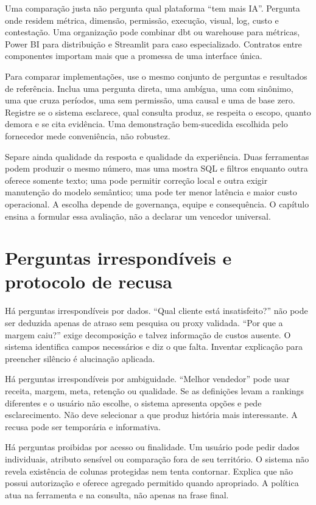 Uma comparação justa não pergunta qual plataforma ``tem mais IA''. Pergunta onde residem métrica, dimensão, permissão, execução, visual, log, custo e contestação. Uma organização pode combinar dbt ou warehouse para métricas, Power BI para distribuição e Streamlit para caso especializado. Contratos entre componentes importam mais que a promessa de uma interface única.

Para comparar implementações, use o mesmo conjunto de perguntas e resultados de referência. Inclua uma pergunta direta, uma ambígua, uma com sinônimo, uma que cruza períodos, uma sem permissão, uma causal e uma de base zero. Registre se o sistema esclarece, qual consulta produz, se respeita o escopo, quanto demora e se cita evidência. Uma demonstração bem-sucedida escolhida pelo fornecedor mede conveniência, não robustez.

Separe ainda qualidade da resposta e qualidade da experiência. Duas ferramentas podem produzir o mesmo número, mas uma mostra SQL e filtros enquanto outra oferece somente texto; uma pode permitir correção local e outra exigir manutenção do modelo semântico; uma pode ter menor latência e maior custo operacional. A escolha depende de governança, equipe e consequência. O capítulo ensina a formular essa avaliação, não a declarar um vencedor universal.

\section{Perguntas irrespondíveis e protocolo de recusa}

Há perguntas irrespondíveis por dados. ``Qual cliente está insatisfeito?'' não pode ser deduzida apenas de atraso sem pesquisa ou proxy validada. ``Por que a margem caiu?'' exige decomposição e talvez informação de custos ausente. O sistema identifica campos necessários e diz o que falta. Inventar explicação para preencher silêncio é alucinação aplicada.

Há perguntas irrespondíveis por ambiguidade. ``Melhor vendedor'' pode usar receita, margem, meta, retenção ou qualidade. Se as definições levam a rankings diferentes e o usuário não escolhe, o sistema apresenta opções e pede esclarecimento. Não deve selecionar a que produz história mais interessante. A recusa pode ser temporária e informativa.

Há perguntas proibidas por acesso ou finalidade. Um usuário pode pedir dados individuais, atributo sensível ou comparação fora de seu território. O sistema não revela existência de colunas protegidas nem tenta contornar. Explica que não possui autorização e oferece agregado permitido quando apropriado. A política atua na ferramenta e na consulta, não apenas na frase final.


